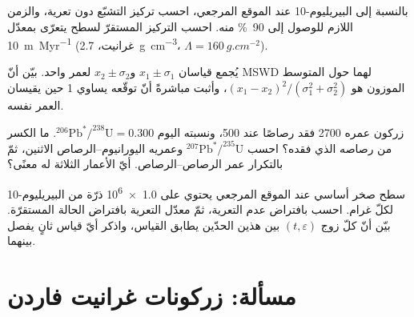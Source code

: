 \begin{exercise}[$\star\star$]\label{exo:b3:advanced-geochronology:9}
بالنسبة إلى البيريليوم-10 عند الموقع المرجعي، احسب تركيز التشبّع
دون تعرية، والزمن اللازم للوصول إلى \qty{90}{\percent} منه. احسب التركيز
المستقرّ لسطح يتعرّى بمعدّل \qty{10}{m.Myr^{-1}} (غرانيت،
\qty{2.7}{g.cm^{-3}}، $\Lambda = \qty{160}{g.cm^{-2}}$).
\end{exercise}

\begin{exercise}[$\star\star\star$]\label{exo:b3:advanced-geochronology:10}
يُجمع قياسان $x_1 \pm \sigma_1$ و$x_2 \pm \sigma_2$ لعمر واحد.
بيّن أنّ MSWD لهما حول المتوسط الموزون هو
$(x_1 - x_2)^2/(\sigma_1^2 + \sigma_2^2)$، وأثبت مباشرةً أنّ
توقّعه يساوي 1 حين يقيسان العمر نفسه.
\end{exercise}

\begin{exercise}[$\star\star\star$]\label{exo:b3:advanced-geochronology:11}
زركون عمره \qty{2700}{\Ma} فقد رصاصًا عند \qty{500}{\Ma}، ونسبته اليوم
$^{206}\mathrm{Pb}^*/^{238}\mathrm{U} = 0.300$. ما الكسر من رصاصه الذي فقده؟
احسب $^{207}\mathrm{Pb}^*/^{235}\mathrm{U}$ وعمريه اليورانيوم--الرصاص
الاثنين، ثمّ بالتكرار عمر الرصاص--الرصاص. أيّ الأعمار الثلاثة
له معنًى؟
\end{exercise}

\begin{exercise}[$\star\star\star$]\label{exo:b3:advanced-geochronology:12}
سطح صخر أساسي عند الموقع المرجعي يحتوي على \num{1.0e6} ذرّة من
البيريليوم-10 لكلّ غرام. احسب  بافتراض عدم التعرية، ثمّ
معدّل التعرية بافتراض الحالة المستقرّة. بيّن أنّ كلّ زوج $(t, \varepsilon)$
بين هذين الحدّين يطابق القياس، واذكر أيّ قياس ثانٍ
يفصل بينهما.
\end{exercise}

\section{مسألة: زركونات غرانيت فاردن}

